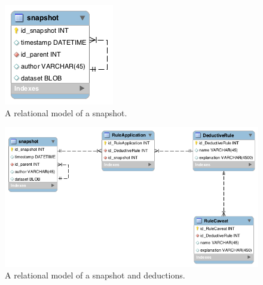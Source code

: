 \begin{figure}
  \includegraphics[scale=0.5]{figures/snapshot_model}
  \caption{A relational model of a snapshot.}
  \label{snapshot_model}
\end{figure}

\begin{figure}
  \includegraphics[scale=0.5]{figures/deduction_model}
  \caption{A relational model of a snapshot and deductions.}
  \label{deduction_model}
\end{figure}

